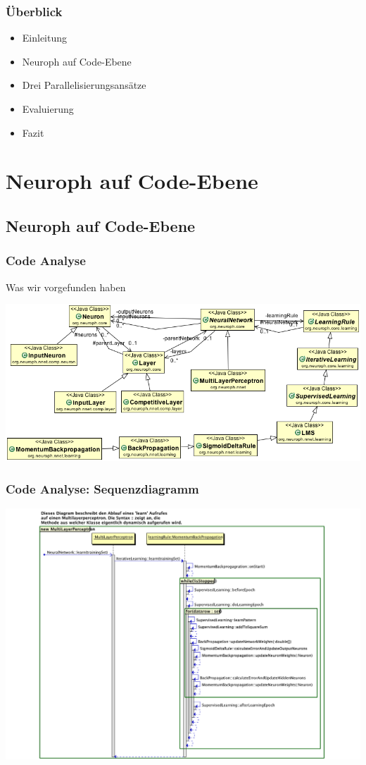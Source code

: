 \documentclass[18pt]{beamer}
\begin{document}
	\begin{frame}[c]\frametitle{Überblick}
		\begin{itemize}
		   \item Einleitung \checkmark
		   \item Neuroph auf Code-Ebene 
		   \item Drei Parallelisierungsansätze
		   \item Evaluierung
		   \item Fazit
		\end{itemize}
	\end{frame}
	
	\section{Neuroph auf Code-Ebene}
	\subsection{Neuroph auf Code-Ebene}
	\begin{frame}[c]\frametitle{Code Analyse}
		\begin{block}{Was wir vorgefunden haben}
			\begin{center}
				\includegraphics[scale=0.4]{images/Klassendiagramm.png}
			\end{center}
		\end{block}
	\end{frame}
	
	\begin{frame}[c]\frametitle{Code Analyse: Sequenzdiagramm}
			\begin{center}
			  \includegraphics[scale=0.4]{images/Learn.pdf} 
			\end{center}
	\end {frame}			
	
\end{document}
